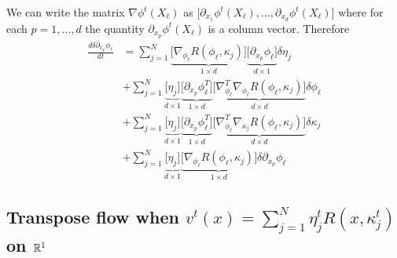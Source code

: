 \documentclass[noinfoline]{imsart}
\begin{document}
{We can write the matrix $\nabla \phi^t(X_\ell)$ as $\bigl[\partial_{x_1}\phi^t(X_\ell), \ldots,\partial_{x_d}\phi^t(X_\ell )\bigr]$ where for each $p=1,\ldots, d$ the quantity $\partial_{x_p}\phi^t(X_\ell)$ is a column vector. Therefore
\begin{align*}
\frac{d\delta\partial_{x_p}\phi_\ell}{dt} 
&= \sum_{j=1}^N\underbrace{\bigl[ \nabla_{\phi_\ell}R(\phi_\ell,\kappa_j)\bigr]}_{1\times d} \underbrace{\bigl[\partial_{x_p}{\phi}_\ell \bigr]}_{d \times 1}  \delta\eta_j \\
&+ \sum_{j=1}^N \underbrace{\bigl[ \eta_j\bigr]}_{d\times 1} \underbrace{\bigl[\partial_{x_p} {\phi_\ell^T}\bigr]}_{1\times d} \underbrace{\bigl[\nabla_{\phi_\ell}^T\nabla_{\phi_\ell}R(\phi_\ell,\kappa_j)\bigr]}_{d\times d}  \delta\phi_\ell  \\
&+ \sum_{j=1}^N \underbrace{\bigl[\eta_j\bigr]}_{d\times 1}   \underbrace{\bigl[\partial_{x_p} {\phi_\ell^T}\bigr]}_{1\times d}  \underbrace{\bigl[\nabla^T_{\phi_\ell}\nabla_{\kappa_j}R(\phi_\ell,\kappa_j)\bigr]}_{d\times d}  \delta\kappa_j    \\
&+ \sum_{j=1}^N \underbrace{\bigl[\eta_j\bigr]}_{d\times 1} \underbrace{\bigl[ \nabla_{\phi_\ell}R(\phi_\ell,\kappa_j)\bigr]}_{1\times d} \delta\partial_{x_p} {\phi}_\ell
\end{align*}


\subsection{Transpose flow when  $v^t(x)=\sum_{j=1}^N \eta^t_j R(x,\kappa^t_j) $ on $\Bbb R^1$}

}
\end{document}
